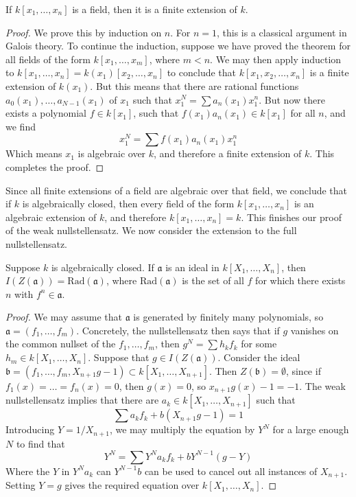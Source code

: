 \begin{lemma}
    If $k[x_1, \dots, x_n]$ is a field, then it is a finite extension of $k$.
\end{lemma}
\begin{proof}
    We prove this by induction on $n$. For $n = 1$, this is a classical argument in Galois theory. To continue the induction, suppose we have proved the theorem for all fields of the form $k[x_1, \dots, x_m]$, where $m < n$. We may then apply induction to $k[x_1, \dots, x_n] = k(x_1)[x_2, \dots, x_n]$ to conclude that $k[x_1, x_2, \dots, x_n]$ is a finite extension of $k(x_1)$. But this means that there are rational functions $a_0(x_1), \dots, a_{N-1}(x_1)$ of $x_1$ such that $x_1^N = \sum a_n(x_1) x_1^n$. But now there exists a polynomial $f \in k[x_1]$, such that $f(x_1) a_n(x_1) \in k[x_1]$ for all $n$, and we find
    \[ x_1^N = \sum f(x_1) a_n(x_1) x_1^n \]
    Which means $x_1$ is algebraic over $k$, and therefore a finite extension of $k$. This completes the proof.
\end{proof}

Since all finite extensions of a field are algebraic over that field, we conclude that if $k$ is algebraically closed, then every field of the form $k[x_1, \dots, x_n]$ is an algebraic extension of $k$, and therefore $k[x_1, \dots, x_n] = k$. This finishes our proof of the weak nullstellensatz. We now consider the extension to the full nullstellensatz.

\begin{theorem}
    Suppose $k$ is algebraically closed. If $\mathfrak{a}$ is an ideal in $k[X_1, \dots, X_n]$, then $I(Z(\mathfrak{a})) = \text{Rad}(\mathfrak{a})$, where $\text{Rad}(\mathfrak{a})$ is the set of all $f$ for which there exists $n$ with $f^n \in \mathfrak{a}$.
\end{theorem}
\begin{proof}
    We may assume that $\mathfrak{a}$ is generated by finitely many polynomials, so $\mathfrak{a} = (f_1, \dots, f_m)$.  Concretely, the nullstellensatz then says that if $g$ vanishes on the common nullset of the $f_1, \dots, f_m$, then $g^N = \sum h_kf_k$ for some $h_m \in k[X_1, \dots, X_n]$. Suppose that $g \in I(Z(\mathfrak{a}))$. Consider the ideal $\mathfrak{b} = (f_1, \dots, f_m, X_{n+1}g - 1) \subset k[X_1, \dots, X_{n+1}]$. Then $Z(\mathfrak{b}) = \emptyset$, since if $f_1(x) = \dots = f_n(x) = 0$, then $g(x) = 0$, so $x_{n+1}g(x) - 1 = -1$. The weak nullstellensatz implies that there are $a_k \in k[X_1, \dots, X_{n+1}]$ such that
    \[ \sum a_k f_k + b (X_{n+1}g - 1) = 1 \]
    Introducing $Y = 1/X_{n+1}$, we may multiply the equation by $Y^N$ for a large enough $N$ to find that
    \[ Y^N = \sum Y^N a_k f_k + b Y^{N-1}(g - Y) \]
    Where the $Y$ in $Y^N a_k$  can $Y^{N-1}b$ can be used to cancel out all instances of $X_{n+1}$. Setting $Y = g$ gives the required equation over $k[X_1, \dots, X_n]$.
\end{proof}

